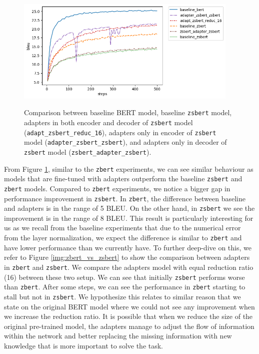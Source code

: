 \begin{figure}[h]
    {\includegraphics[width=0.95\textwidth]{img/zsbert_pos.png}}
    \centering
    \caption{Comparison between baseline BERT model, baseline \texttt{zsbert} model, adapters in both encoder and decoder of \texttt{zsbert} model (\texttt{adapt\_zsbert\_reduc\_16}), adapters only in encoder of \texttt{zsbert} model (\texttt{adapter\_zsbert\_zsbert}), and adapters only in decoder of \texttt{zsbert} model (\texttt{zsbert\_adapter\_zsbert}).}
    \label{img:zsbert_pos}
\end{figure}

From Figure \ref{img:zsbert_pos}, similar to the \texttt{zbert} experiments, we can see similar behaviour as models that are fine-tuned with adapters outperform the baseline \texttt{zsbert} and \texttt{zbert} models. Compared to \texttt{zbert} experiments, we notice a bigger gap in performance improvement in \texttt{zsbert}. In \texttt{zbert}, the difference between baseline and adapters is in the range of 5 BLEU. On the other hand, in \texttt{zsbert} we see the improvement is in the range of 8 BLEU. This result is particularly interesting for us as we recall from the baseline experiments that due to the numerical error from the layer normalization, we expect the difference is similar to \texttt{zbert} and have lower performance than we currently have. To further deep-dive on this, we refer to Figure \ref{img:zbert_vs_zsbert} to show the comparison between adapters in \texttt{zbert} and \texttt{zsbert}. We compare the adapters model with equal reduction ratio (16) between these two setup. We can see that initially \texttt{zsbert} performs worse than \texttt{zbert}. After some steps, we can see the performance in \texttt{zbert} starting to stall but not in \texttt{zsbert}. We hypothesize this relates to similar reason that we state on the original BERT model where we could not see any improvement when we increase the reduction ratio. It is possible that when we reduce the size of the original pre-trained model, the adapters manage to adjust the flow of information within the network and better replacing the missing information with new knowledge that is more important to solve the task.

